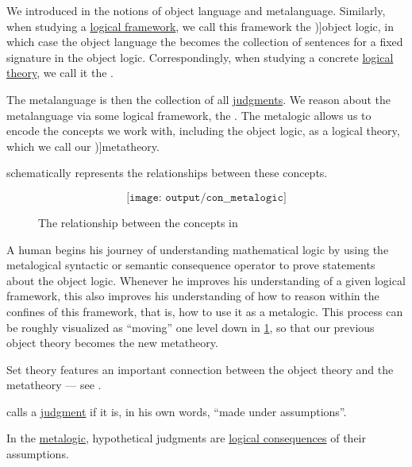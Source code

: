 \begin{concept}\label{con:metalogic}
  We introduced in  the notions of object language and metalanguage. Similarly, when studying a \hyperref[def:logical_framework]{logical framework}, we call this framework the \term[en=object logic (\cite[3]{Kleene2002Logic})]{object logic}, in which case the object language the becomes the collection of sentences for a fixed signature in the object logic. Correspondingly, when studying a concrete \hyperref[def:logical_theory]{logical theory}, we call it the .

  The metalanguage is then the collection of all \hyperref[con:judgment]{judgments}. We reason about the metalanguage via some logical framework, the . The metalogic allows us to encode the concepts we work with, including the object logic, as a logical theory, which we call our \term[en=metatheory (\cite[199]{Kleene2002Logic})]{metatheory}.

   schematically represents the relationships between these concepts.

  \begin{figure}[!ht]
    \begin{equation*}
      \texttt{[image: output/con\_\_metalogic]}
    \end{equation*}
    \caption{The relationship between the concepts in }\label{fig:con:metalogic}
  \end{figure}

  A human begins his journey of understanding mathematical logic by using the metalogical syntactic or semantic consequence operator to prove statements about the object logic. Whenever he improves his understanding of a given logical framework, this also improves his understanding of how to reason within the confines of this framework, that is, how to use it as a metalogic. This process can be roughly visualized as \enquote{moving} one level down in \cref{fig:con:metalogic}, so that our previous object theory becomes the new metatheory.
\end{concept}
\begin{comments}
  \item Set theory features an important connection between the object theory and the metatheory --- see .
\end{comments}

\begin{concept}\label{con:hypothetical_judgment}
   calls a \hyperref[con:judgment]{judgment}  if it is, in his own words, \enquote{made under assumptions}.
\end{concept}
\begin{comments}
  \item In the \hyperref[con:metalogic]{metalogic}, hypothetical judgments are \hyperref[def:consequence_relation]{logical consequences} of their assumptions.
\end{comments}

